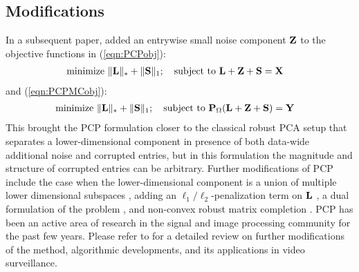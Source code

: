 \subsection{Modifications}
In a subsequent paper, \cite{ZhouEtal10} added an entrywise small noise component ${\mathbf{Z}}$ to the objective functions in (\ref{eqn:PCPobj}):
%
\begin{align}\label{eqn:PCPobjZ}
& \text{minimize } \| {\mathbf{L}} \|_* + \| {\mathbf{S}} \|_1; \quad \text{subject to } {\mathbf{L}} + {\mathbf{Z}} + {\mathbf{S}} = {\mathbf{X}}
\end{align}
%
and (\ref{eqn:PCPMCobj}):
%
\begin{align}\label{eqn:PCPMCobjZ}
& \text{minimize } \| {\mathbf{L}} \|_* + \| {\mathbf{S}} \|_1; \quad \text{subject to } {\mathbf{P}}_\Omega({\mathbf{L}} + {\mathbf{Z}} + {\mathbf{S}}) = {\mathbf{Y}}
\end{align}
%
This brought the PCP formulation closer to the classical robust PCA setup that separates a lower-dimensional component in presence of both data-wide additional noise and corrupted entries, but in this formulation the magnitude and structure of corrupted entries can be arbitrary. Further modifications of PCP include the case when the lower-dimensional component is a union of multiple lower dimensional subspaces \citep{WohlbergEtal12}, adding an $\ell_1/\ell_2$-penalization term on ${\mathbf{L}}$ \citep{TangNehorai11}, a dual formulation of the problem \citep{BeckerEtal11}, and non-convex robust matrix completion \citep{ShangEtal14}. PCP has been an active area of research in the signal and image processing community for the past few years. Please refer to \cite{Bouwmans14} for a detailed review on further modifications of the method, algorithmic developments, and its applications in video surveillance.